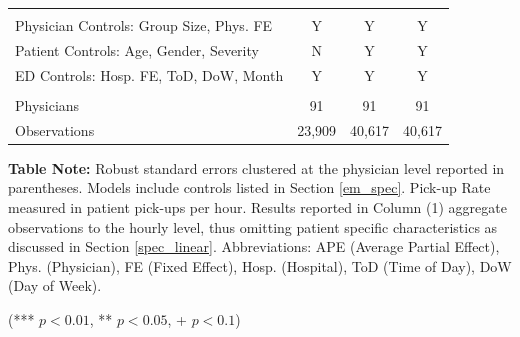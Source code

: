\begin{table}[htbp]
{\begin{threeparttable}[t]
\begin{tabular}{lcccc}
          &       &       &       &  \\
    Physician Controls: Group Size, Phys. FE & Y     & \multicolumn{2}{c}{Y} & Y \\
    Patient Controls: Age, Gender, Severity & N     & \multicolumn{2}{c}{Y} & Y \\
    ED Controls: Hosp. FE, ToD, DoW, Month & Y     & \multicolumn{2}{c}{Y} & Y \\
          &       &       &       &  \\
    Physicians & 91    & \multicolumn{2}{c}{91} & 91 \\
    Observations & 23,909 & \multicolumn{2}{c}{40,617} &  40,617  \\
    \end{tabular}%
    \medskip
    \begin{tablenotes}
      \footnotesize
      \item \textbf{Table Note:} Robust standard errors clustered at the physician level reported in parentheses. Models include controls listed in Section \ref{em_spec}. Pick-up Rate measured in patient pick-ups per hour. Results reported in Column (1) aggregate observations to the hourly level, thus omitting patient specific characteristics as discussed in Section \ref{spec_linear}. Abbreviations: APE (Average Partial Effect), Phys. (Physician), FE (Fixed Effect), Hosp. (Hospital), ToD (Time of Day), DoW (Day of Week). %
      \item (*** $p < 0.01$, ** $p < 0.05$, + $p < 0.1$)
    \end{tablenotes}
  \label{tab:H1H2}
  \end{threeparttable} }
 \end{table}
 

